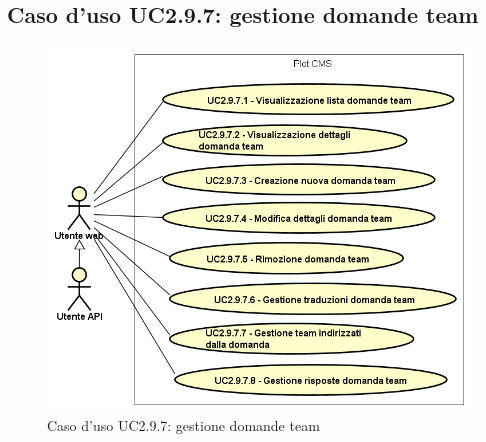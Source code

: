 \hypertarget{UC2.9.7}{}
\subsection{Caso d'uso UC2.9.7: gestione domande team}

        \begin{figure}[H]
            \centering
            \includegraphics[scale=0.65, width=\textwidth]{immagini/usecase/UC2-9-7.png}
            \caption{Caso d'uso UC2.9.7: gestione domande team}\label{fig:UC2.9.7} 
        \end{figure}
